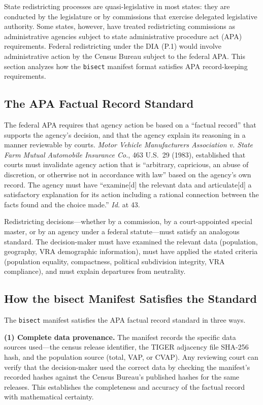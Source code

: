 State redistricting processes are quasi-legislative in most states: they are conducted by the legislature or by commissions that exercise delegated legislative authority. Some states, however, have treated redistricting commissions as administrative agencies subject to state administrative procedure act (APA) requirements. Federal redistricting under the DIA (P.1) would involve administrative action by the Census Bureau subject to the federal APA. This section analyzes how the \texttt{bisect} manifest format satisfies APA record-keeping requirements.

\subsection{The APA Factual Record Standard}

The federal APA requires that agency action be based on a ``factual record'' that supports the agency's decision, and that the agency explain its reasoning in a manner reviewable by courts. \textit{Motor Vehicle Manufacturers Association v. State Farm Mutual Automobile Insurance Co.}, 463 U.S.\ 29 (1983), established that courts must invalidate agency action that is ``arbitrary, capricious, an abuse of discretion, or otherwise not in accordance with law'' based on the agency's own record. The agency must have ``examine[d] the relevant data and articulate[d] a satisfactory explanation for its action including a rational connection between the facts found and the choice made.'' \textit{Id.} at 43.

Redistricting decisions---whether by a commission, by a court-appointed special master, or by an agency under a federal statute---must satisfy an analogous standard. The decision-maker must have examined the relevant data (population, geography, VRA demographic information), must have applied the stated criteria (population equality, compactness, political subdivision integrity, VRA compliance), and must explain departures from neutrality.

\subsection{How the bisect Manifest Satisfies the Standard}

The \texttt{bisect} manifest satisfies the APA factual record standard in three ways.

\textbf{(1) Complete data provenance.} The manifest records the specific data sources used---the census release identifier, the TIGER adjacency file SHA-256 hash, and the population source (total, VAP, or CVAP). Any reviewing court can verify that the decision-maker used the correct data by checking the manifest's recorded hashes against the Census Bureau's published hashes for the same releases. This establishes the completeness and accuracy of the factual record with mathematical certainty.

